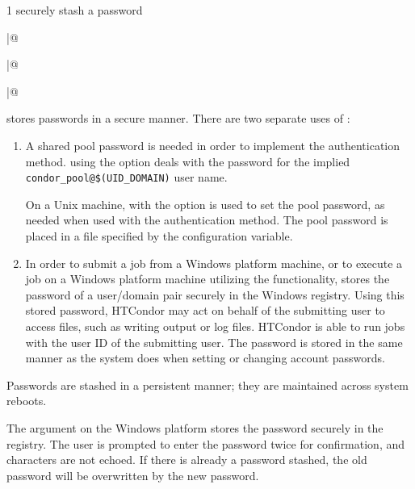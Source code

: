\begin{ManPage}{\label{man-condor-store-cred}}{1}
{securely stash a password}

\Synopsis
{}

\Lbr
{} \verb@|@ 
\Rbr 
{}

\Lbr
{} \verb@|@ 
\Rbr 
{}

\Lbr
{} \verb@|@ 
\Rbr 
{}

\Description 

 stores passwords in a secure manner.
There are two separate uses of :
\begin{enumerate}
\item A shared pool password is needed in order to implement the 
 authentication method.
 using the  option deals with the
password for the implied \verb|condor_pool@$(UID_DOMAIN)| user name.

On a Unix machine, 
 with the  option is used to set
the pool password,
as needed when used with the  authentication method.
The pool password is placed in a file specified by 
the  configuration variable.

\item In order to submit a job from a Windows platform machine,
or to execute a job on a Windows platform machine utilizing the
 functionality, 
 stores the password
of a user/domain pair securely in the Windows registry.
Using this stored password, 
HTCondor may act on behalf of the submitting user to access files,
such as writing output or log files. 
HTCondor is able to
run jobs with the user ID of the submitting user.
The password is stored in the same manner as the system does when
setting or changing account passwords.
\end{enumerate}

Passwords are stashed in a persistent manner; they are maintained
across system reboots.

The  argument on the Windows platform 
stores the password securely in the registry.
The user is prompted to enter the password twice for confirmation, 
and characters are not echoed.
If there is already a password stashed,
the old password will be overwritten by the new password.


\end{ManPage}
